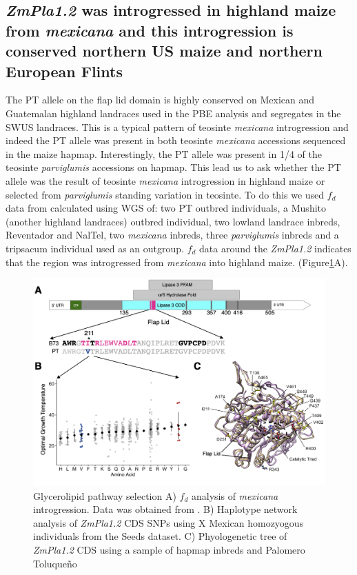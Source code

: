 \documentclass[9pt,twocolumn,twoside]{BioRxiv}
\begin{document}
\subsection{\textit{ZmPla1.2} was introgressed in highland maize from \textit{mexicana} and this introgression is conserved northern US maize and northern European Flints}
The PT allele on the flap lid domain is highly conserved on Mexican and Guatemalan highland landraces used in the PBE analysis and segregates in the SWUS landraces. 
This is a typical pattern of teosinte \textit{mexicana} introgression \cite{Wang2020-mp} and indeed the PT allele was present in both teosinte \textit{mexicana} accessions sequenced in the maize hapmap. Interestingly, the PT allele was present in 1/4 of the teosinte \textit{parviglumis} accessions on hapmap. 
This lead us to ask whether the PT allele was the result of teosinte \textit{mexicana} introgression in highland maize or selected from \textit{parviglumis} standing variation in teosinte. To do this we used \(f_d\) data from \cite{Gonzalez-Segovia2019-jy} calculated using WGS of: two PT outbred individuals, a Mushito (another highland landraces) outbred individual, two lowland landrace inbreds, Reventador and NalTel, two \textit{mexicana} inbreds, three \textit{parviglumis} inbreds and a tripsacum individual used as an outgroup. 
\(f_d\) data around the \textit{ZmPla1.2} indicates that the region was introgressed from \textit{mexicana} into highland maize. (Figure\ref{Fig4}A).

\begin{figure}[h]
\begin{center}
\includegraphics[width=0.41\paperwidth]{Figures/Fig_4.png}
\caption{Glycerolipid pathway selection 
A) \(f_d\) analysis of \textit{mexicana} introgression. Data was obtained from \cite{Gonzalez-Segovia2019-jy}. 
B) Haplotype network analysis of \textit{ZmPla1.2} CDS SNPs using X Mexican homozyogous individuals from the Seeds dataset.
C) Phyologenetic tree of \textit{ZmPla1.2} CDS using a sample of hapmap inbreds and Palomero Toluqueño} 
\label{Fig4}
\end{center}
\end{figure} 
\end{document}
